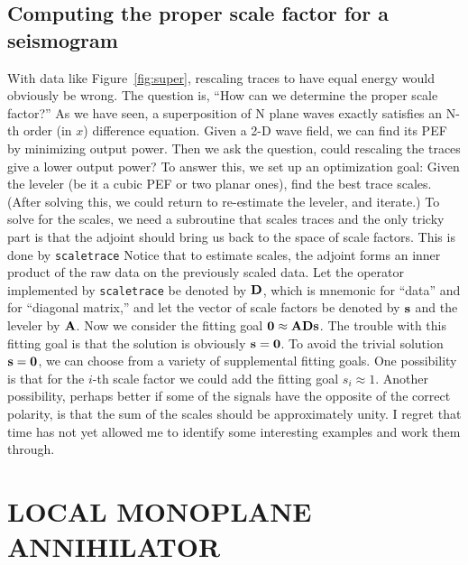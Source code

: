 \subsection{Computing the proper scale factor for a seismogram}
With data like Figure~\ref{fig:super},
rescaling traces to have equal energy would obviously be wrong.
The question is, ``How can we determine the proper scale factor?''
As we have seen, a superposition of N plane waves exactly
satisfies an N-th order (in $x$) difference equation.
Given a 2-D wave field,
we can find its PEF
by minimizing output power.
Then we ask the question,
could rescaling the traces give a lower output power?
To answer this, we set up an optimization goal:
Given the leveler (be it a cubic PEF or two planar ones),
find the best trace scales.
(After solving this,
we could return to re-estimate the leveler,
and iterate.)
To solve for the scales,
we need a subroutine that scales traces
and the only tricky part is that the adjoint should
bring us back to the space of scale factors.
This is done by \texttt{scaletrace}
Notice that to estimate scales,
the adjoint forms an inner product of the raw data
on the previously scaled data.
Let the operator implemented by \texttt{scaletrace}
be denoted by $\bold D$,
which is mnemonic for ``data'' and for ``diagonal matrix,''
and let the vector of scale factors be denoted by $\bold s$ and
the leveler by $\bold A$.
Now we consider the fitting goal $\bold 0\approx \bold A \bold D \bold s$.
The trouble with this fitting goal is that the solution
is obviously $\bold s = \bold 0$.
To avoid the trivial solution $\bold s = \bold 0$,
we can choose from a variety of supplemental fitting goals.
One possibility is that for the $i$-th scale factor
we could add the fitting goal $s_i\approx 1$.
Another possibility, perhaps better if some of the signals
have the opposite of the correct polarity,
is that the sum of the scales should be approximately unity.
I regret that time has not yet allowed me
to identify some interesting examples and work them through.

\section{LOCAL MONOPLANE ANNIHILATOR}



